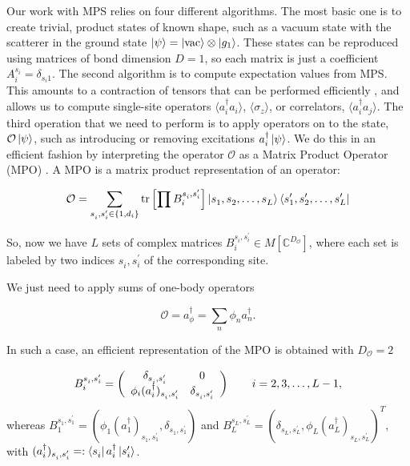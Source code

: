 \documentclass[aps,pra,reprint,amsmath,amssymb]{revtex4-1}
\begin{document}
Our work with MPS relies on four different algorithms. The most basic one is to create trivial, product states of known shape, such as a vacuum state with the scatterer in the ground state $\ket{\psi}=\ket{\text{vac}}\otimes \ket{g_1}$. These states can be reproduced using matrices of bond dimension $D=1$, so each matrix is just a coefficient $A_i^{s_i}=\delta_{s_i1}$. The second algorithm is to compute expectation values from MPS. This amounts to a contraction of tensors that can be performed efficiently \cite{Ripoll2006}, and allows us to compute single-site operators $\langle a^\dagger_i a_i\rangle$, $\langle \sigma_z\rangle$, or correlators, $\langle a_i^\dagger a_j\rangle$. The third operation that we need to perform is to apply operators on to the state, $\mathcal{O}\ket{\psi}$, such as introducing or removing excitations $a_i^\dagger\ket{\psi}$. We do this in an efficient fashion by interpreting the operator $\mathcal{O}$ as a Matrix Product Operator (MPO) \cite{Pirvu2010}. A MPO is a matrix product representation of an operator:

\begin{equation}
\mathcal{O} = \sum_{s_{i}^{},s_{i}^\prime \in \{1,d_i\}} \mathrm{tr}\left[\prod B_i^{s_i^{},s_i^\prime}\right]\ket{s_1^{},s_2^{},\ldots,s_L^{}}\bra{s_1^\prime,s_2^\prime,\ldots,s_L^\prime}
\end{equation}

So, now we have $L$ sets of complex matrices $B_i^{s_i^{},s_i^\prime} \in M[\mathbb{C}^{D_\mathcal{O}}]$, where each set is labeled by two indices $s_i^{},s_i^\prime$ of the corresponding site.

We just need to apply sums of one-body operators

\begin{equation}
\mathcal{O} = a_\phi^\dagger = \sum_n \phi_n a_n^\dagger.
\end{equation}

In such a case, an efficient representation of the MPO is obtained with $D_\mathcal{O}=2$

\begin{equation}
B_i^{s_i^{},s_i^\prime}=\left(\begin{array}{c c}
\delta_{s_i^{},s_i^\prime} & 0\\
\phi_i(a_i^\dagger)_{s_i^{},s_i^\prime} & \delta_{s_i^{},s_i^\prime}
\end{array}\right)\qquad i=2,3,\dots,L-1,
\end{equation}
whereas $B_1^{s_1^{},s_1^\prime}=(\phi_1(a_1^\dagger)_{s_1^{},s_1^\prime},\delta_{s_1^{},s_1^\prime})$ and $B_L^{s_L^{},s_L^\prime}=(\delta_{s_L^{},s_L^\prime},\phi_L(a_L^\dagger)_{s_L^{},s_L^\prime})^T$, with $(a_i^\dagger)_{s_i^{},s_i^\prime}=:\bra{s_i^{}}a_i^\dagger\ket{s_i^\prime}$.
\end{document}
